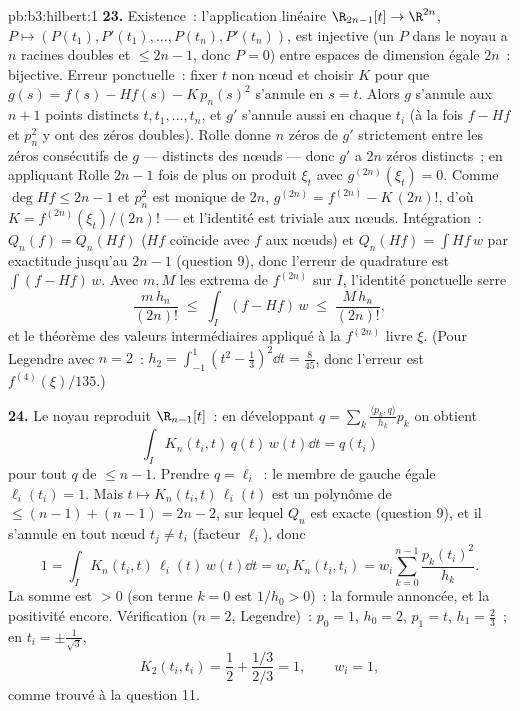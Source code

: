 \begin{solution}{pb:b3:hilbert:1}
\textbf{23.} Existence~: l'application linéaire $\R_{2n-1}[t]
\to \R^{2n}$, $P \mapsto (P(t_1), P'(t_1), \dots, P(t_n),
P'(t_n))$, est injective (un $P$ dans le noyau a $n$ racines
doubles et  $\leq 2n - 1$, donc $P = 0$) entre espaces
de dimension égale $2n$~: bijective. Erreur ponctuelle~: fixer
$t$ non nœud et choisir $K$ pour que $g(s) = f(s) - Hf(s) -
K\,p_n(s)^2$ s'annule en $s = t$. Alors $g$ s'annule aux $n +
1$ points distincts $t, t_1, \dots, t_n$, et $g'$ s'annule
aussi en chaque $t_i$ (à la fois $f - Hf$ et $p_n^2$ y ont
des zéros doubles). Rolle donne $n$ zéros de $g'$ strictement
entre les zéros consécutifs de $g$ --- distincts des nœuds ---
donc $g'$ a $2n$ zéros distincts~; en appliquant Rolle $2n -
1$ fois de plus on produit $\xi_t$ avec $g^{(2n)}(\xi_t) =
0$. Comme $\deg Hf \leq 2n - 1$ et $p_n^2$ est monique de
 $2n$, $g^{(2n)} = f^{(2n)} - K\,(2n)!$, d'où $K =
f^{(2n)}(\xi_t)/(2n)!$ --- et l'identité est triviale aux
nœuds. Intégration~: $Q_n(f) = Q_n(Hf)$ ($Hf$ coïncide avec
$f$ aux nœuds) et $Q_n(Hf) = \int Hf\,w$ par exactitude
jusqu'au  $2n - 1$ (question 9), donc l'erreur de
quadrature est $\int(f - Hf)\,w$. Avec $m, M$ les extrema de
$f^{(2n)}$ sur $I$, l'identité ponctuelle serre
\[
\frac{m\,h_n}{(2n)!} \;\leq\; \int_I(f - Hf)\,w
\;\leq\; \frac{M\,h_n}{(2n)!} ,
\]
et le théorème des valeurs intermédiaires appliqué à la
 $f^{(2n)}$ livre $\xi$. (Pour Legendre avec $n =
2$~: $h_2 = \int_{-1}^1(t^2 - \frac13)^2\dd t =
\frac8{45}$, donc l'erreur est $f^{(4)}(\xi)/135$.)

\textbf{24.} Le noyau reproduit $\R_{n-1}[t]$~: en développant
$q = \sum_k\frac{\langle p_k, q\rangle}{h_k}p_k$ on obtient
\[
\int_I K_n(t_i, t)\,q(t)\,w(t)\dd t = q(t_i)
\]
pour tout $q$ de  $\leq n - 1$.
Prendre $q = \ell_i$~: le membre de gauche égale
$\ell_i(t_i) = 1$. Mais $t \mapsto K_n(t_i, t)\,\ell_i(t)$
est un polynôme de 
$\leq (n - 1) + (n - 1) = 2n - 2$, sur lequel $Q_n$ est exacte
(question 9), et il s'annule en tout nœud $t_j \neq t_i$
(facteur $\ell_i$), donc
\[
1 = \int_I K_n(t_i, t)\,\ell_i(t)\,w(t)\dd t
= w_i\,K_n(t_i, t_i)
= w_i\sum_{k=0}^{n-1}\frac{p_k(t_i)^2}{h_k} .
\]
La somme est $> 0$ (son terme $k = 0$ est $1/h_0 > 0$)~: la
formule annoncée, et la positivité encore. Vérification ($n =
2$, Legendre)~: $p_0 = 1$, $h_0 = 2$, $p_1 = t$, $h_1 =
\frac23$~; en $t_i = \pm\frac1{\sqrt3}$,
\[
K_2(t_i, t_i) = \frac12 + \frac{1/3}{2/3} = 1,
\qquad w_i = 1,
\]
comme trouvé à la question 11.


\end{solution}
